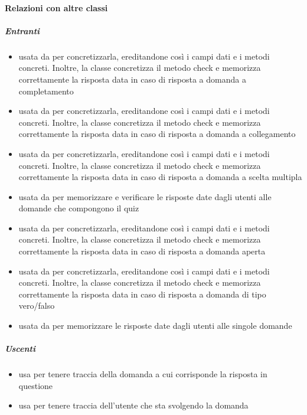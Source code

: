 \paragraph{Relazioni con altre classi}
\subparagraph{Entranti}
\begin{itemize}
\item usata da  per concretizzarla, ereditandone così i campi dati e i metodi concreti. Inoltre, la classe concretizza il metodo check e memorizza correttamente la risposta data in caso di risposta a domanda a completamento
\item usata da  per concretizzarla, ereditandone così i campi dati e i metodi concreti. Inoltre, la classe concretizza il metodo check e memorizza correttamente la risposta data in caso di risposta a domanda a collegamento
\item usata da  per concretizzarla, ereditandone così i campi dati e i metodi concreti. Inoltre, la classe concretizza il metodo check e memorizza correttamente la risposta data in caso di risposta a domanda a scelta multipla
\item usata da  per memorizzare e verificare le risposte date dagli utenti alle domande che compongono il quiz
\item usata da  per concretizzarla, ereditandone così i campi dati e i metodi concreti. Inoltre, la classe concretizza il metodo check e memorizza correttamente la risposta data in caso di risposta a domanda aperta
\item usata da  per concretizzarla, ereditandone così i campi dati e i metodi concreti. Inoltre, la classe concretizza il metodo check e memorizza correttamente la risposta data in caso di risposta a domanda di tipo vero/falso
\item usata da  per memorizzare le risposte date dagli utenti alle singole domande
\end{itemize}
\subparagraph{Uscenti}
\begin{itemize}
\item usa  per tenere traccia della domanda a cui corrisponde la risposta in questione
\item usa  per tenere traccia dell'utente che sta svolgendo la domanda
\end{itemize}
